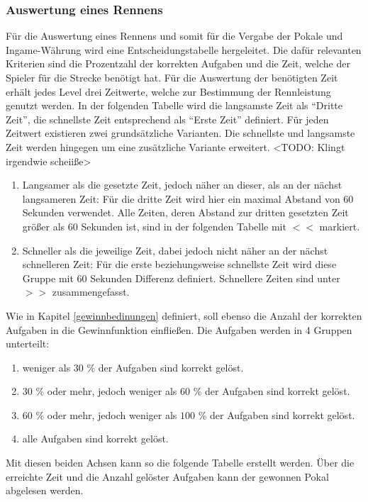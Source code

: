 	\subsubsection{Auswertung eines Rennens}
	Für die Auswertung eines Rennens und somit für die Vergabe der Pokale und Ingame-Währung wird eine Entscheidungstabelle hergeleitet. Die dafür relevanten Kriterien sind die Prozentzahl der korrekten Aufgaben und die Zeit, welche der Spieler für die Strecke benötigt hat.
	Für die Auswertung der benötigten Zeit erhält jedes Level drei Zeitwerte, welche zur Bestimmung der Rennleistung genutzt werden. In der folgenden Tabelle wird die langsamste Zeit als \enquote{Dritte Zeit}, die schnellste Zeit entsprechend als \enquote{Erste Zeit} definiert. Für jeden Zeitwert existieren zwei grundsätzliche Varianten. Die schnellste und langsamste Zeit werden hingegen um eine zusätzliche Variante erweitert.
	<TODO: Klingt irgendwie scheiiße>
	\begin{enumerate}
		\item{ Langsamer als die gesetzte Zeit, jedoch näher an dieser, als an der nächst langsameren Zeit: Für die dritte Zeit wird hier ein maximal Abstand von $60$ Sekunden verwendet. Alle Zeiten, deren Abstand zur dritten gesetzten Zeit größer als $60$ Sekunden ist, sind in der folgenden Tabelle mit $<<$ markiert. }
		\item{ Schneller als die jeweilige Zeit, dabei jedoch nicht näher an der nächst schnelleren Zeit: Für die erste beziehungsweise schnellste Zeit wird diese Gruppe mit $60$ Sekunden Differenz definiert. Schnellere Zeiten sind unter $>>$ zusammengefasst. }
	\end{enumerate}
	Wie in Kapitel \ref{gewinnbedinungen} definiert, soll ebenso die Anzahl der korrekten Aufgaben in die Gewinnfunktion einfließen. Die Aufgaben werden in 4 Gruppen unterteilt:
	\begin{enumerate}
		\item{ weniger als $30$ \% der Aufgaben sind korrekt gelöst. }
		\item{ $30$ \% oder mehr, jedoch weniger als $60$ \% der Aufgaben sind korrekt gelöst. }
		\item{ $60$ \% oder mehr, jedoch weniger als $100$ \% der Aufgaben sind korrekt gelöst. }
		\item{ alle Aufgaben sind korrekt gelöst. }
	\end{enumerate}
	Mit diesen beiden Achsen kann so die folgende Tabelle erstellt werden. Über die erreichte Zeit und die Anzahl gelöster Aufgaben kann der gewonnen Pokal abgelesen werden.

